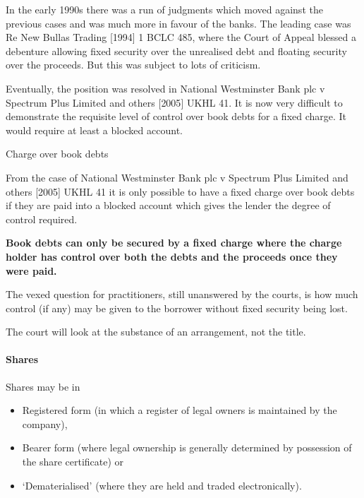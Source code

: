 \documentclass[
]{article}
\providecommand{\tightlist}{%
  \setlength{\itemsep}{0pt}\setlength{\parskip}{0pt}}
\newenvironment{env-be598745-44b1-4815-8875-ed2abeb511dd}
{
    \savenotes\tcolorbox[blanker,breakable,left=5pt,borderline west={2pt}{-4pt}{cyan}]
}
{
    \endtcolorbox\spewnotes
}
\begin{document}
In the early 1990s there was a run of judgments which moved against the
previous cases and was much more in favour of the banks. The leading
case was Re New Bullas Trading {[}1994{]} 1 BCLC 485, where the Court of
Appeal blessed a debenture allowing fixed security over the unrealised
debt and floating security over the proceeds. But this was subject to
lots of criticism.

Eventually, the position was resolved in National Westminster Bank plc v
Spectrum Plus Limited and others {[}2005{]} UKHL 41. It is now very
difficult to demonstrate the requisite level of control over book debts
for a fixed charge. It would require at least a blocked account.

\begin{env-be598745-44b1-4815-8875-ed2abeb511dd}

Charge over book debts

From the case of National Westminster Bank plc v Spectrum Plus Limited
and others {[}2005{]} UKHL 41 it is only possible to have a fixed charge
over book debts if they are paid into a blocked account which gives the
lender the degree of control required.

\textbf{Book debts can only be secured by a fixed charge where the
charge holder has control over both the debts and the proceeds once they
were paid.}

\end{env-be598745-44b1-4815-8875-ed2abeb511dd}

The vexed question for practitioners, still unanswered by the courts, is
how much control (if any) may be given to the borrower without fixed
security being lost.

The court will look at the substance of an arrangement, not the title.

\hypertarget{shares}{%
\paragraph{Shares}\label{shares}}

Shares may be in

\begin{itemize}
\tightlist
\item
  Registered form (in which a register of legal owners is maintained by
  the company),
\item
  Bearer form (where legal ownership is generally determined by
  possession of the share certificate) or
\item
  `Dematerialised' (where they are held and traded electronically).
\end{itemize}
\end{document}
